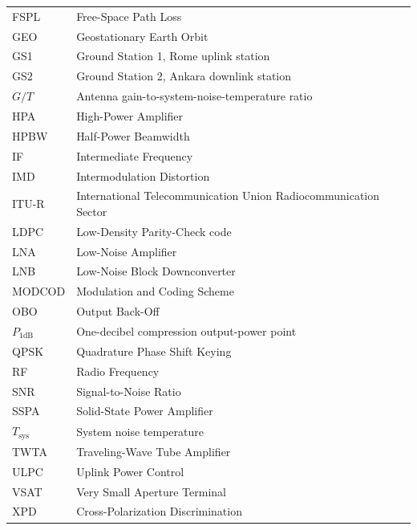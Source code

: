 \begin{longtable}{@{}>{\raggedright\arraybackslash}p{}>{\raggedright\arraybackslash}p{}@{}}
    FSPL & Free-Space Path Loss \\
    GEO & Geostationary Earth Orbit \\
    GS1 & Ground Station 1, Rome uplink station \\
    GS2 & Ground Station 2, Ankara downlink station \\
    $G/T$ & Antenna gain-to-system-noise-temperature ratio \\
    HPA & High-Power Amplifier \\
    HPBW & Half-Power Beamwidth \\
    IF & Intermediate Frequency \\
    IMD & Intermodulation Distortion \\
    ITU-R & International Telecommunication Union Radiocommunication Sector \\
    LDPC & Low-Density Parity-Check code \\
    LNA & Low-Noise Amplifier \\
    LNB & Low-Noise Block Downconverter \\
    MODCOD & Modulation and Coding Scheme \\
    OBO & Output Back-Off \\
    $P_{1\mathrm{dB}}$ & One-decibel compression output-power point \\
    QPSK & Quadrature Phase Shift Keying \\
    RF & Radio Frequency \\
    SNR & Signal-to-Noise Ratio \\
    SSPA & Solid-State Power Amplifier \\
    $T_{\mathrm{sys}}$ & System noise temperature \\
    TWTA & Traveling-Wave Tube Amplifier \\
    ULPC & Uplink Power Control \\
    VSAT & Very Small Aperture Terminal \\
    XPD & Cross-Polarization Discrimination \\
    \bottomrule
\end{longtable}
\renewcommand{\arraystretch}{1.0}
\normalsize
\setcounter{table}{\value{nomenclatureSavedTable}}
